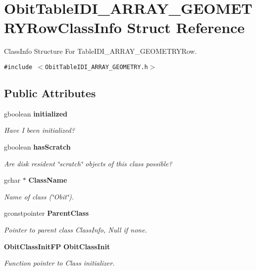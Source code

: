 \section{Obit\-Table\-IDI\_\-ARRAY\_\-GEOMETRYRow\-Class\-Info Struct Reference}
\label{structObitTableIDI__ARRAY__GEOMETRYRowClassInfo}
Class\-Info Structure For Table\-IDI\_\-ARRAY\_\-GEOMETRYRow.  


{\tt \#include $<$Obit\-Table\-IDI\_\-ARRAY\_\-GEOMETRY.h$>$}

\subsection*{Public Attributes}
\begin{CompactItemize}
\item 
gboolean {\bf initialized}
\begin{CompactList}\small\item\em Have I been initialized? \item\end{CompactList}\item 
gboolean {\bf has\-Scratch}
\begin{CompactList}\small\item\em Are disk resident \char`\"{}scratch\char`\"{} objects of this class possible? \item\end{CompactList}\item 
gchar $\ast$ {\bf Class\-Name}
\begin{CompactList}\small\item\em Name of class (\char`\"{}Obit\char`\"{}). \item\end{CompactList}\item 
gconstpointer {\bf Parent\-Class}
\begin{CompactList}\small\item\em Pointer to parent class Class\-Info, Null if none. \item\end{CompactList}\item 
{\bf Obit\-Class\-Init\-FP} {\bf Obit\-Class\-Init}
\begin{CompactList}\small\item\em Function pointer to Class initializer. \item\end{CompactList}\item 

\end{CompactItemize}
